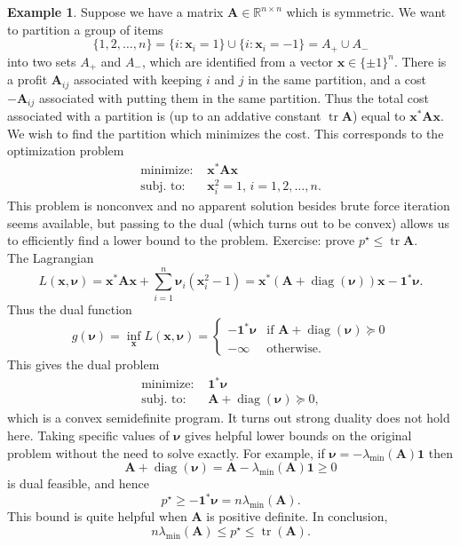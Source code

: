 \documentclass[10pt,letterpaper]{article}
\theoremstyle{definition}
\newtheorem{example}[theorem]{Example}
\theoremstyle{remark}
\newcommand\R{\mathbb{R}}
\newcommand\tr{\operatorname{tr}}
\newcommand\A{\boldsymbol{A}}
\newcommand\x{\boldsymbol{x}}
\newcommand\nub{\boldsymbol{\nu}}
\begin{document}
\begin{example}
    Suppose we have a matrix $\A\in\R^{n\times n}$ which is symmetric. We want to
    partition a group of items
    \[
        \{1,2,\ldots,n\} = \{i : \x_i = 1\} \cup \{i : \x_i = -1\} = A_+ \cup A_-
    \]
    into two sets $A_+$ and $A_-$, which are identified from a vector $\x\in\{\pm 1\}^n$.
    There is a profit $\A_{ij}$ associated with keeping $i$ and $j$ in the same partition,
    and a cost $-\A_{ij}$ associated with putting them in the same partition.
    Thus the total cost associated with a partition is (up to an addative constant $\tr\A$)
    equal to $\x^*\A\x$. We wish to find the partition which minimizes the cost. This
    corresponds to the optimization problem
    \begin{align*}
        \text{minimize: } & \x^*\A\x\\
        \text{subj. to: } & \x_i^2 = 1,\,i=1,2,\ldots,n.
    \end{align*}
    This problem is nonconvex and no apparent solution besides brute force iteration seems
    available, but passing to the dual (which turns out to be convex) allows us to efficiently
    find a lower bound to the problem. Exercise: prove $p^\star \leq \tr\A$.\\

    The Lagrangian
    \[
        L(\x,\nub) = \x^*\A\x + \sum_{i=1}^n \nub_i (\x_i^2 - 1) = \x^*(\A + \operatorname{diag}(\nub))\x - \boldsymbol{1}^*\nub.
    \]
    Thus the dual function
    \[
        g(\nub) = \inf_{\x} L(\x,\nub) = \begin{cases}
            -\boldsymbol{1}^*\nub & \text{if } \A + \operatorname{diag}(\nub) \succeq 0\\
            -\infty & \text{otherwise.}
        \end{cases}
    \]
    This gives the dual problem
    \begin{align*}
        \text{minimize: } & \boldsymbol{1}^* \nub\\
        \text{subj. to: } & \A + \operatorname{diag}(\nub) \succeq 0,
    \end{align*}
    which is a convex semidefinite program. It turns out strong duality does not hold here.
    Taking specific values of $\nub$ gives helpful lower bounds on the original problem without
    the need to solve exactly. For example, if $\nub = -\lambda_{\min}(\A)\boldsymbol{1}$ then
    \[
        \A + \operatorname{diag}(\nub) = \A - \lambda_{\min}(\A)\boldsymbol{1} \geq 0
    \]
    is dual feasible, and hence
    \[
        p^\star \geq -\boldsymbol{1}^*\nub = n\lambda_{\min}(\A).
    \]
    This bound is quite helpful when $\A$ is positive definite.
    In conclusion,
    \[
        n\lambda_{\min}(\A) \leq p^\star \leq \tr(\A).
    \]
\end{example}
\end{document}
